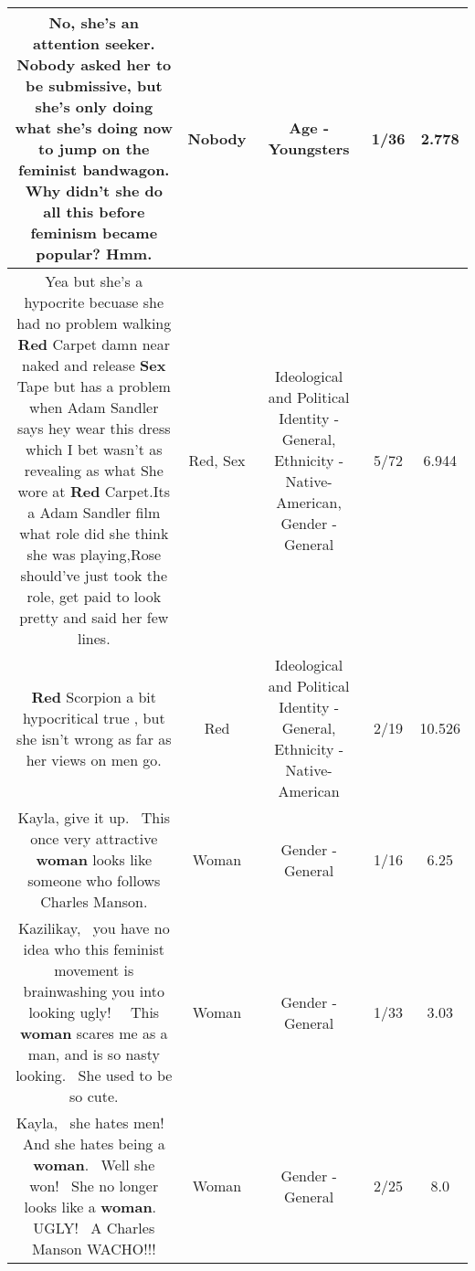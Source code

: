 \documentclass[11pt]{article}
\newlength\mylength
\begin{document}
\begin{center}
\begin{longtable}{|C{.65\mylength}|C{.30\mylength}|C{.12\mylength}|C{.12\mylength}|C{.12\mylength}|}
  \small No, she's an attention seeker.  \textbf{Nobody} asked her to be submissive, but she's only doing what she's doing now to jump on the feminist bandwagon.  Why didn't she do all this before feminism became popular?  Hmm.\normalsize   & Nobody & Age - Youngsters & 1/36 & 2.778 \\  \hline
  \small Yea but she's a hypocrite becuase she had no problem walking \textbf{R\textbf{ed}} Carpet damn near naked and release \textbf{Sex} Tape but has a problem when Adam Sandler says hey wear this dress which I bet wasn't as revealing as what She wore at \textbf{R\textbf{ed}} Carpet.Its a Adam Sandler film what role did she think she was playing,Rose should've just took the role, get paid to look pretty and said her few lines.\normalsize   & Red, Sex &  Ideological and Political Identity - General, Ethnicity - Native-American, Gender - General & 5/72 & 6.944 \\  \hline
  \small \@\textbf{R\textbf{ed}} Scorpion a bit hypocritical true , but she isn't wrong as far as her views on men go.\normalsize   & Red &  Ideological and Political Identity - General, Ethnicity - Native-American & 2/19 & 10.526 \\  \hline
  \small Kayla, give it up.  This once very attractive \textbf{woman} looks like someone who follows Charles Manson.\normalsize   & Woman & Gender - General & 1/16 & 6.25 \\  \hline
  \small Kazilikay,  you have no idea who this feminist movement is brainwashing you into looking ugly!   This \textbf{woman} scares me as a man, and is so nasty looking.  She used to be so cute.\normalsize   & Woman & Gender - General & 1/33 & 3.03 \\  \hline
  \small Kayla,  she hates men!  And she hates being a \textbf{woman}.  Well she won!  She no longer looks like a \textbf{woman}.  UGLY!  A Charles Manson WACHO!!!\normalsize   & Woman & Gender - General & 2/25 & 8.0 \\  \hline

\end{longtable}
\end{center}
\end{document}
